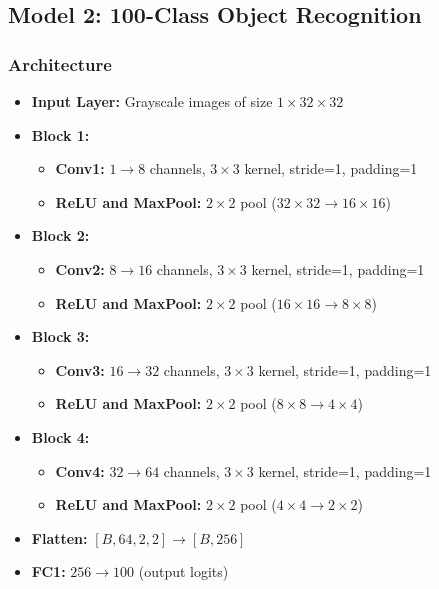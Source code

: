 \documentclass[11pt,a4paper]{article}
\begin{document}
\subsection{Model 2: 100-Class Object Recognition}
\subsubsection{Architecture}
\begin{itemize}
    \item \textbf{Input Layer:} Grayscale images of size $1 \times 32 \times 32$
    \item \textbf{Block 1:}
        \begin{itemize}
            \item \textbf{Conv1:} $1 \rightarrow 8$ channels, $3 \times 3$ kernel, stride=1, padding=1
            \item \textbf{ReLU and MaxPool:} $2 \times 2$ pool ($32 \times 32 \rightarrow 16 \times 16$)
        \end{itemize}
    \item \textbf{Block 2:}
        \begin{itemize}
            \item \textbf{Conv2:} $8 \rightarrow 16$ channels, $3 \times 3$ kernel, stride=1, padding=1
            \item \textbf{ReLU and MaxPool:} $2 \times 2$ pool ($16 \times 16 \rightarrow 8 \times 8$)
        \end{itemize}
    \item \textbf{Block 3:}
        \begin{itemize}
            \item \textbf{Conv3:} $16 \rightarrow 32$ channels, $3 \times 3$ kernel, stride=1, padding=1
            \item \textbf{ReLU and MaxPool:} $2 \times 2$ pool ($8 \times 8 \rightarrow 4 \times 4$)
        \end{itemize}
    \item \textbf{Block 4:}
        \begin{itemize}
            \item \textbf{Conv4:} $32 \rightarrow 64$ channels, $3 \times 3$ kernel, stride=1, padding=1
            \item \textbf{ReLU and MaxPool:} $2 \times 2$ pool ($4 \times 4 \rightarrow 2 \times 2$)
        \end{itemize}
    \item \textbf{Flatten:} $[B, 64, 2, 2] \rightarrow [B, 256]$
    \item \textbf{FC1:} $256 \rightarrow 100$ (output logits)
\end{itemize}
\end{document}
